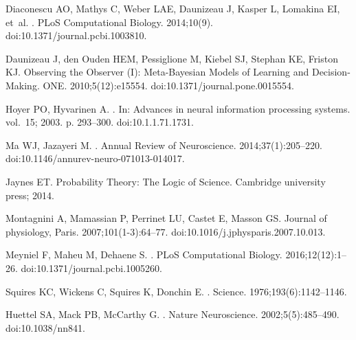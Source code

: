 \documentclass[10pt,letterpaper]{article}
\begin{document}
\begin{thebibliography}{10}
Diaconescu AO, Mathys C, Weber LAE, Daunizeau J, Kasper L, Lomakina EI, et~al.
.
\newblock PLoS Computational Biology. 2014;10(9).
\newblock doi:{10.1371/journal.pcbi.1003810}.

Daunizeau J, den Ouden HEM, Pessiglione M, Kiebel SJ, Stephan KE, Friston KJ.
\newblock Observing the Observer (I): Meta-Bayesian Models of Learning and
  Decision-Making.
 {ONE}. 2010;5(12):e15554.
\newblock doi:{10.1371/journal.pone.0015554}.

Hoyer PO, Hyvarinen A.
.
\newblock In: Advances in neural information processing systems. vol.~15; 2003.
  p. 293--300.
\newblock doi:{10.1.1.71.1731}.

Ma WJ, Jazayeri M.
.
\newblock Annual Review of Neuroscience. 2014;37(1):205--220.
\newblock doi:{10.1146/annurev-neuro-071013-014017}.

Jaynes ET.
\newblock Probability Theory: The Logic of Science.
\newblock Cambridge university press; 2014.

Montagnini A, Mamassian P, Perrinet LU, Castet E, Masson GS.
\newblock Journal of physiology, Paris. 2007;101(1-3):64--77.
\newblock doi:{10.1016/j.jphysparis.2007.10.013}.

Meyniel F, Maheu M, Dehaene S.
.
\newblock PLoS Computational Biology. 2016;12(12):1--26.
\newblock doi:{10.1371/journal.pcbi.1005260}.

Squires KC, Wickens C, Squires K, Donchin E.
.
\newblock Science. 1976;193(6):1142--1146.

Huettel SA, Mack PB, McCarthy G.
.
\newblock Nature Neuroscience. 2002;5(5):485--490.
\newblock doi:{10.1038/nn841}.


\end{thebibliography}
\end{document}
